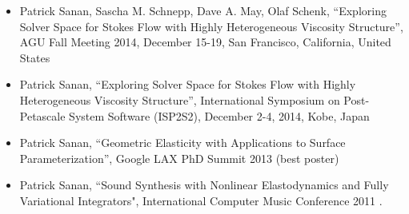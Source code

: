 \documentclass[12pt]{article}
\begin{document}
\begin{itemize}
\item Patrick Sanan, Sascha M. Schnepp, Dave A. May, Olaf Schenk, ``Exploring Solver Space for Stokes Flow with Highly Heterogeneous Viscosity Structure'', AGU Fall Meeting 2014, December 15-19, San Francisco, California, United States
\item Patrick Sanan, ``Exploring Solver Space for Stokes Flow with Highly Heterogeneous Viscosity Structure'', International Symposium on Post-Petascale System Software (ISP2S2), December 2-4, 2014, Kobe, Japan
\item Patrick Sanan, ``Geometric Elasticity with Applications to Surface Parameterization'', Google LAX PhD Summit 2013 (best poster)
\item Patrick Sanan, ``Sound Synthesis with Nonlinear Elastodynamics and Fully Variational Integrators", International Computer Music Conference 2011 .
\end{itemize}
\end{document}
